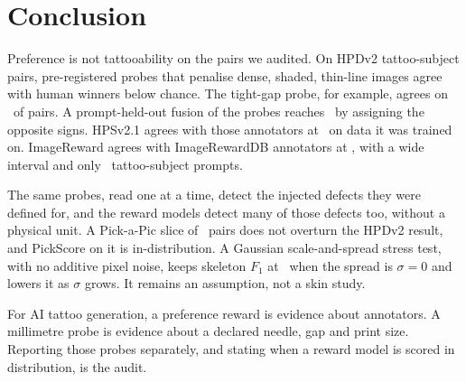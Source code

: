 \section{Conclusion}
\label{sec:conclusion}

Preference is not tattooability on the pairs we audited.
On HPDv2 tattoo-subject pairs, pre-registered probes that penalise dense, shaded, thin-line images agree with human winners below chance.
The tight-gap probe, for example, agrees on \HpdFractightgapfiveAcc\ of pairs.
A prompt-held-out fusion of the probes reaches \FusHpdProbespreregisteredAcc\ by assigning the opposite signs.
HPSv2.1 agrees with those annotators at \HpdHpstwoAcc\ on data it was trained on.
ImageReward agrees with ImageRewardDB annotators at \IrImagerewardAcc, with a wide interval and only \NIrTsprompts\ tattoo-subject prompts.

The same probes, read one at a time, detect the injected defects they were defined for, and the reward models detect many of those defects too, without a physical unit.
A Pick-a-Pic slice of \PapHpstwoN\ pairs does not overturn the HPDv2 result, and PickScore on it is in-distribution.
A Gaussian scale-and-spread stress test, with no additive pixel noise, keeps skeleton $F_1$ at \ssFoneSizeThreeSpreadZero\ when the spread is $\sigma{=}0$ and lowers it as $\sigma$ grows.
It remains an assumption, not a skin study.

For AI tattoo generation, a preference reward is evidence about annotators.
A millimetre probe is evidence about a declared needle, gap and print size.
Reporting those probes separately, and stating when a reward model is scored in distribution, is the audit.
